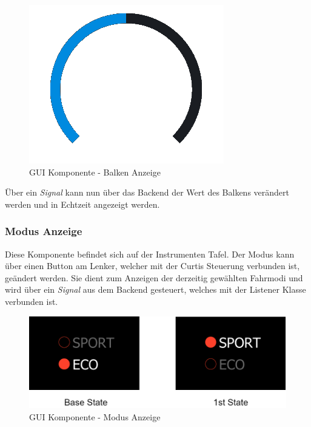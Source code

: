 \begin{figure}[H]
	\begin{center}
		\includegraphics[scale=0.5]{figures/hcis/component_bar.png}
		\caption{GUI Komponente - Balken Anzeige}
		\label{fig:kompBalken}
	\end{center}
\end{figure}

Über ein \textit{Signal} kann nun über das Backend der Wert des Balkens verändert werden und in Echtzeit angezeigt werden.

\subsubsection{Modus Anzeige}
Diese Komponente befindet sich auf der Instrumenten Tafel. Der Modus kann über einen Button am Lenker, welcher mit der Curtis Steuerung verbunden ist, geändert werden. Sie dient zum Anzeigen der derzeitig gewählten Fahrmodi und wird über ein \textit{Signal} aus dem Backend gesteuert, welches mit der Listener Klasse verbunden ist.

\begin{figure}[H]
	\begin{center}
		\includegraphics[scale=0.4]{figures/hcis/component_mode.png}
		\caption{GUI Komponente - Modus Anzeige}
				\label{fig:kompModus}
	\end{center}
\end{figure}

